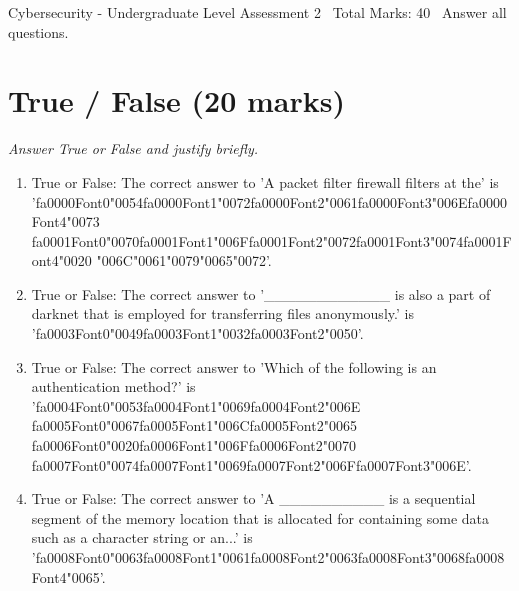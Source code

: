 \documentclass[12pt]{article}
\begin{document}
\begin{center}
Cybersecurity - Undergraduate Level Assessment 2 \
Total Marks: 40 \
Answer all questions.
\end{center}

\section*{True / False (20 marks)}
\textit{Answer True or False and justify briefly.}
\begin{enumerate}[label=\arabic*.]
\item True or False: The correct answer to 'A packet filter firewall filters at the' is '{\csname fa0000Font0\endcsname\char"0054}{\csname fa0000Font1\endcsname\char"0072}{\csname fa0000Font2\endcsname\char"0061}{\csname fa0000Font3\endcsname\char"006E}{\csname fa0000Font4\endcsname\char"0073} {\csname fa0001Font0\endcsname\char"0070}{\csname fa0001Font1\endcsname\char"006F}{\csname fa0001Font2\endcsname\char"0072}{\csname fa0001Font3\endcsname\char"0074}{\csname fa0001Font4\endcsname\char"0020} {\char"006C}{\char"0061}{\char"0079}{\char"0065}{\char"0072}'.
\item True or False: The correct answer to '\_\_\_\_\_\_\_\_\_\_\_\_ is also a part of darknet that is employed for transferring files anonymously.' is '{\csname fa0003Font0\endcsname\char"0049}{\csname fa0003Font1\endcsname\char"0032}{\csname fa0003Font2\endcsname\char"0050}'.
\item True or False: The correct answer to 'Which of the following is an authentication method?' is '{\csname fa0004Font0\endcsname\char"0053}{\csname fa0004Font1\endcsname\char"0069}{\csname fa0004Font2\endcsname\char"006E} {\csname fa0005Font0\endcsname\char"0067}{\csname fa0005Font1\endcsname\char"006C}{\csname fa0005Font2\endcsname\char"0065} {\csname fa0006Font0\endcsname\char"0020}{\csname fa0006Font1\endcsname\char"006F}{\csname fa0006Font2\endcsname\char"0070} {\csname fa0007Font0\endcsname\char"0074}{\csname fa0007Font1\endcsname\char"0069}{\csname fa0007Font2\endcsname\char"006F}{\csname fa0007Font3\endcsname\char"006E}'.
\item True or False: The correct answer to 'A \_\_\_\_\_\_\_\_\_\_ is a sequential segment of the memory location that is allocated for containing some data such as a character string or an...' is '{\csname fa0008Font0\endcsname\char"0063}{\csname fa0008Font1\endcsname\char"0061}{\csname fa0008Font2\endcsname\char"0063}{\csname fa0008Font3\endcsname\char"0068}{\csname fa0008Font4\endcsname\char"0065}'.

\end{enumerate}
\end{document}
